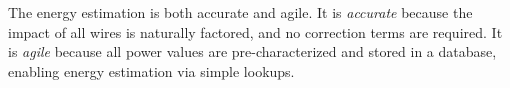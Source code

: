 The energy estimation is both accurate and agile.
It is \emph{accurate} because the impact of all wires is naturally factored, and no correction terms are required.
It is \textit{agile} because all power values are pre-characterized and stored in a database, enabling energy estimation via simple lookups. 
